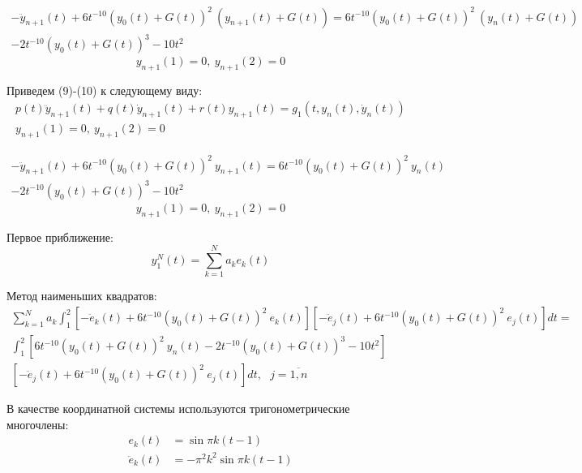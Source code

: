 \documentclass[12pt]{article}
\begin{document}
\begin{multline}
-\ddot{y}_{n+1}(t) + 6t^{-10}(y_0(t) + G(t))^2\ (y_{n+1}(t) + G(t)) =
 6t^{-10}(y_0(t) + G(t))^2\ (y_n(t) + G(t)) \\- 2t^{-10}(y_0(t) + G(t))^3 - 10t^2
\end{multline}
\begin{equation}
y_{n+1}(1)=0,\ y_{n+1}(2)=0
\end{equation}

Приведем (9)-(10) к следующему виду:
\begin{gather}
p(t)\ddot{y}_{n+1}(t) + q(t)\dot{y}_{n+1}(t) + r(t)y_{n+1}(t) = g_1(t, y_n(t), \dot{y}_n(t)) \\
y_{n+1}(1) = 0,\ y_{n+1}(2) = 0
\end{gather}

\begin{multline}
-\ddot{y}_{n+1}(t) + 6t^{-10}(y_0(t) + G(t))^2\ y_{n+1}(t) =
6t^{-10}(y_0(t) + G(t))^2\ y_n(t) \\- 2t^{-10}(y_0(t) + G(t))^3 - 10t^2
\end{multline}
\begin{equation}
y_{n+1}(1) = 0,\ y_{n+1}(2) = 0
\end{equation}

Первое приближение:
\begin{equation}
y_1^N(t) = \sum_{k = 1}^{N}a_ke_k(t)
\end{equation}

Метод наименьших квадратов:
\begin{multline}
\sum_{k = 1}^{N}a_k \int_1^2 [-\ddot{e}_k(t) + 6t^{-10}(y_0(t) + G(t))^2\ e_k(t)]
[-\ddot{e}_j(t) + 6t^{-10}(y_0(t) + G(t))^2\ e_j(t)]dt = \\
\int_1^2[6t^{-10}(y_0(t)+G(t))^2\ y_n(t) - 2t^{-10}(y_0(t)+G(t))^3 - 10t^2]\\ [-\ddot{e}_j(t) + 6t^{-10}(y_0(t) + G(t))^2\ e_j(t)]dt,\ \ \
j = \overline{1,n}
\end{multline}

В качестве координатной системы используются тригонометрические многочлены:
\begin{equation}
\begin{split}
e_k(t) &= \sin{\pi k (t - 1)} \\
\ddot{e}_k(t)&= -\pi^2 k^2\sin{\pi k(t-1)}
\end{split}
\end{equation}
\end{document}
